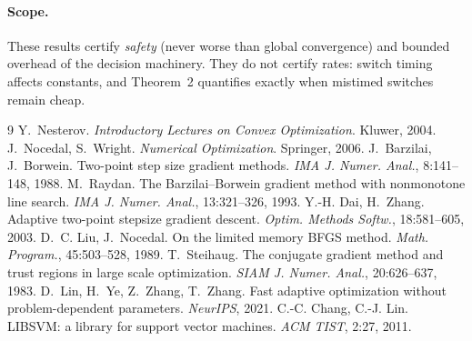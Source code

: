 ﻿\documentclass[10pt]{article}
\begin{document}
\paragraph{Scope.} These results certify \emph{safety} (never worse
than global convergence) and bounded overhead of the decision
machinery. They do not certify rates: switch timing affects constants,
and Theorem~2 quantifies exactly when mistimed switches remain cheap.

\begin{thebibliography}{9}\small
{} Y.~Nesterov. \emph{Introductory Lectures on Convex
Optimization}. Kluwer, 2004.
 J.~Nocedal, S.~Wright. \emph{Numerical Optimization}.
Springer, 2006.
 J.~Barzilai, J.~Borwein. Two-point step size gradient
methods. \emph{IMA J. Numer. Anal.}, 8:141--148, 1988.
 M.~Raydan. The Barzilai--Borwein gradient method with
nonmonotone line search. \emph{IMA J. Numer. Anal.}, 13:321--326, 1993.
 Y.-H. Dai, H.~Zhang. Adaptive two-point stepsize
gradient descent. \emph{Optim. Methods Softw.}, 18:581--605, 2003.
 D.~C. Liu, J.~Nocedal. On the limited memory BFGS
method. \emph{Math. Program.}, 45:503--528, 1989.
 T.~Steihaug. The conjugate gradient method and
trust regions in large scale optimization. \emph{SIAM J. Numer. Anal.},
20:626--637, 1983.
 D.~Lin, H.~Ye, Z.~Zhang, T.~Zhang. Fast adaptive
optimization without problem-dependent parameters. \emph{NeurIPS}, 2021.
 C.-C. Chang, C.-J. Lin. LIBSVM: a library for support
vector machines. \emph{ACM TIST}, 2:27, 2011.
\end{thebibliography}
\end{document}
